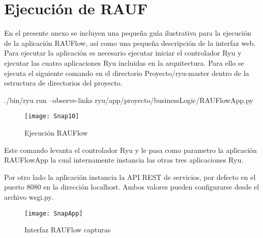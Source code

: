 
\chapter{Ejecuci\'on de RAUF}
\label{appendix5}

\ifpdf
    \graphicspath{{Appendix5/Figs/Raster/}{Appendix5/Figs/PDF/}{Appendix5/Figs/}}
\else
    \graphicspath{{Appendix5/Figs/Vector/}{Appendix5/Figs/}}
\fi

En el presente anexo se incluyen una peque\~na guía ilustrativa para la ejecuci\'on de la aplicaci\'on RAUFlow, así como una pequeña descripción de la interfaz web.\\

Para ejecutar la aplicaci\'on es necesario ejecutar iniciar el controlador Ryu y ejecutar las cuatro aplicaciones Ryu incluidas en la arquitectura. Para ello se ejecuta el siguiente comando en el directorio Proyecto/ryu-master dentro de la estructura de directorios del proyecto.

\begin{center}
./bin/ryu run --observe-links ryu/app/proyecto/businessLogic/RAUFlowApp.py

\end{center}

\begin{figure}[h] 
\centering    
\texttt{[image: Snap10]}
\caption[Ejecuci\'on RAUFlow]{Ejecuci\'on RAUFlow}
\label{fig:Img2}
\end{figure}

Este comando levanta el controlador Ryu y le pasa como parametro la aplicaci\'on RAUFlowApp la cual internamente instancia las otras tres aplicaciones Ryu.

Por otro lado la aplicaci\'on instancia la API REST de servicios, por defecto en el puerto 8080 en la direcci\'on localhost. Ambos valores pueden configurarse desde el archivo wsgi.py.


\begin{figure}[h] 
\centering    
\texttt{[image: SnapApp]}
\caption[Interfaz RAUFlow capturas]{Interfaz RAUFlow capturas}
\label{fig:Img2}
\end{figure}